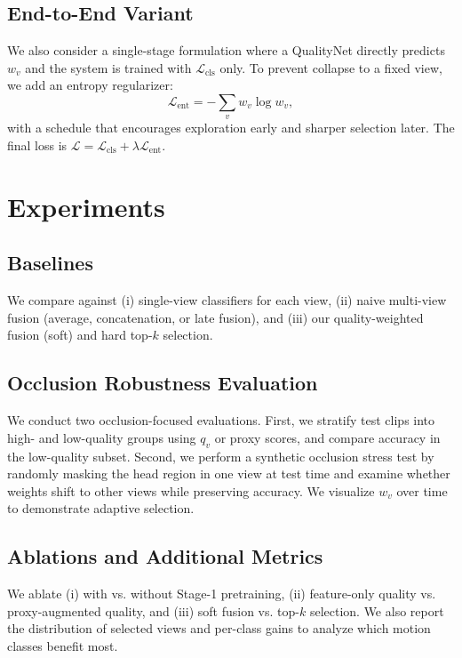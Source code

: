 \documentclass[runningheads]{llncs}
\begin{document}
\subsection{End-to-End Variant}
We also consider a single-stage formulation where a QualityNet directly predicts $w_v$ and the system is trained with $\mathcal{L}_{\text{cls}}$ only. To prevent collapse to a fixed view, we add an entropy regularizer:
\begin{equation}
\mathcal{L}_{\text{ent}} = -\sum_v w_v \log w_v,
\label{equ:ent}
\end{equation}
with a schedule that encourages exploration early and sharper selection later. The final loss is $\mathcal{L} = \mathcal{L}_{\text{cls}} + \lambda \mathcal{L}_{\text{ent}}$.

\section{Experiments}
\label{sec:experiments}

\subsection{Baselines}
We compare against (i) single-view classifiers for each view, (ii) naive multi-view fusion (average, concatenation, or late fusion), and (iii) our quality-weighted fusion (soft) and hard top-$k$ selection.

\subsection{Occlusion Robustness Evaluation}
We conduct two occlusion-focused evaluations. First, we stratify test clips into high- and low-quality groups using $q_v$ or proxy scores, and compare accuracy in the low-quality subset. Second, we perform a synthetic occlusion stress test by randomly masking the head region in one view at test time and examine whether weights shift to other views while preserving accuracy. We visualize $w_v$ over time to demonstrate adaptive selection.

\subsection{Ablations and Additional Metrics}
We ablate (i) with vs. without Stage-1 pretraining, (ii) feature-only quality vs. proxy-augmented quality, and (iii) soft fusion vs. top-$k$ selection. We also report the distribution of selected views and per-class gains to analyze which motion classes benefit most.
\end{document}
